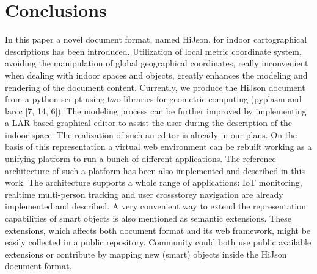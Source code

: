 \documentclass{sig-alternate}
\begin{document}
\section{Conclusions}

In this paper a novel document format, named HiJson, for indoor cartographical descriptions has been introduced. Utilization of local metric coordinate system, avoiding the manipulation of global geographical coordinates, really inconvenient when dealing with indoor spaces and objects, greatly enhances the modeling and rendering of the document content. Currently, we produce the HiJson document from a python script using two libraries for geometric computing (pyplasm and larcc [7, 14, 6]). The modeling process can be further improved by implementing a LAR-based graphical editor to assist the user during the description of the indoor space. The realization of such an editor is already in our plans.
On the basis of this representation a virtual web environment can be rebuilt working as a unifying platform to run a bunch of different applications. The reference architecture of such a platform has been also implemented and described in this work.
The architecture supports a whole range of applications: IoT monitoring, realtime multi-person tracking and user crossstorey navigation are already implemented and described. A very convenient way to extend the representation capabilities of smart objects is also mentioned as semantic extensions. These extensions, which affects both document format and its web framework, might be easily collected in a public repository. Community could both use public available extensions or contribute by mapping new (smart) objects inside the HiJson document format.


\end{document}
